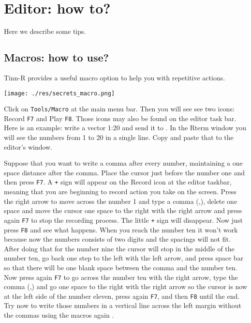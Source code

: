 
\section{Editor: how to?}

Here we describe some tips.

\subsection{Macros: how to use?}

Tinn-R provides a useful macro option to help you with repetitive actions.

\texttt{[image: ./res/secrets\_macro.png]}

Click on \texttt{Tools/Macro} at the main menu bar. Then you will see see two icons: Record \texttt{F7} and Play \texttt{F8}.
Those icons may also be found on the editor task bar. Here is an example: write a vector 1:20 and send it to \RR{}.
In the Rterm window you will see the numbers from 1 to 20 in a single line. Copy and paste that to the editor's window.

Suppose that you want to write a comma after every number, maintaining a one space distance after the comma.
Place the cursor just before the number one and then press \texttt{F7}.
A \texttt{+} sign will appear on the Record icon at the editor taskbar, meaning that you are beginning to record action
you take on the screen. Press the right arrow to move across the number 1 and type a comma (,),
delete one space and move the cursor one space to the right with the right arrow and press again
\texttt{F7} to stop the recording process. The little \texttt{+} sign will disappear.
Now just press \texttt{F8} and see what happens. When you reach the number ten it won't work because now the numbers
consists of two digits and the spacings will not fit.
After doing that for the number nine the cursor will stop in the middle of the number ten,
go back one step to the left with the left arrow, and press space bar so that there will be one blank space
between the comma and the number ten. Now press again \texttt{F7} to go across the number ten with the right arrow,
type the comma (,) and go one space to the right with the right arrow so the cursor is now at the left side of
the number eleven, press again \texttt{F7}, and then \texttt{F8} until the end.
Try now to write those numbers in a vertical line across the left margin without the commas using the macros again .

